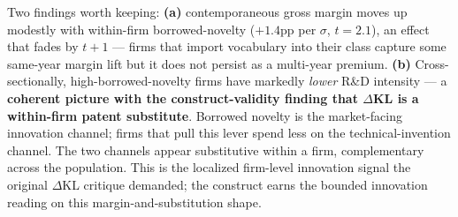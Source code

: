 \documentclass[11pt]{article}
\begin{document}
\noindent Two findings worth keeping: \textbf{(a)} contemporaneous gross
margin moves up modestly with within-firm borrowed-novelty
($+1.4$pp per $\sigma$, $t = 2.1$), an effect that fades by $t+1$ ---
firms that import vocabulary into their class capture some same-year margin
lift but it does not persist as a multi-year premium. \textbf{(b)}
Cross-sectionally, high-borrowed-novelty firms have markedly \emph{lower}
R\&D intensity --- a \textbf{coherent picture with the construct-validity
finding that $\Delta$KL is a within-firm patent substitute}. Borrowed
novelty is the market-facing innovation channel; firms that pull this lever
spend less on the technical-invention channel. The two channels appear
substitutive within a firm, complementary across the population. This is
the localized firm-level innovation signal the original $\Delta$KL critique
demanded; the construct earns the bounded innovation reading on this
margin-and-substitution shape.
\end{document}
